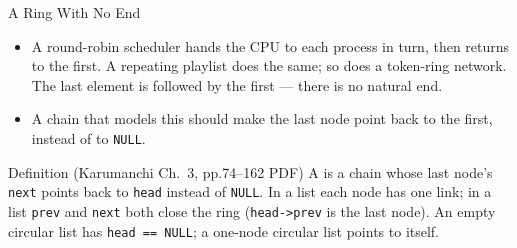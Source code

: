 \documentclass[aspectratio=169]{beamer}
\begin{document}
\begin{frame}{A Ring With No End}
  \begin{itemize}
    \item A round-robin scheduler hands the CPU to each process in turn, then
      returns to the first. A repeating playlist does the same; so does a
      token-ring network. The last element is followed by the first --- there
      is no natural end.
    \item A chain that models this should make the last node point back to the
      first, instead of to \texttt{NULL}.
  \end{itemize}
  \begin{block}{Definition (Karumanchi Ch.~3, pp.74--162 PDF)
    \cite{Karumanchi2017_data_structures_algorithms_made_easy}}
    A  is a chain whose last node's \texttt{next}
    points back to \texttt{head} instead of \texttt{NULL}. In a
     list each node has one link; in a
     list \texttt{prev} and \texttt{next} both close the
    ring (\texttt{head->prev} is the last node). An empty circular list has
    \texttt{head == NULL}; a one-node circular list points to itself.
  \end{block}
\end{frame}
\end{document}
